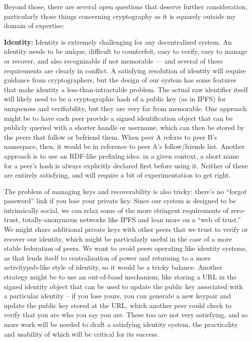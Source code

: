 Beyond those, there are several open questions that deserve further
consideration, particularly those things concerning cryptography as it
is squarely outside my domain of expertise:

\textbf{Identity:} Identity is extremely challenging for any
decentralized system. An identity needs to be unique, difficult to
counterfeit, easy to verify, easy to manage or recover, and also
recognizable if not memorable --- and several of these requirements are
clearly in conflict. A satisfying resolution of identity will require
guidance from cryptographers, but the design of our system has some
features that make identity a less-than-intractable problem. The actual
raw identifier itself will likely need to be a cryptographic hash of a
public key (as in IPFS) for uniqueness and verifiability, but they are
very far from memorable. One approach might be to have each peer provide
a signed identification object that can be publicly queried with a
shorter handle or username, which can then be stored by the peers that
follow or befriend them. When peer A referrs to peer B's namespace,
then, it would be in reference to peer A's follow/friends list. Another
approach is to use an RDF-like prefixing idea: in a given context, a
short name for a peer's hash is always explicitly declared first before
using it. Neither of these are entirely satisfying, and will require a
bit of experimentation to get right.

The problem of managing keys and recoverability is also tricky: there's
no ``forgot password'' link if you lose your private key. Since our
system is designed to be intrinsically social, we can relax some of the
more stringent requirements of zero-trust, totally-anonymous networks
like IPFS and lean more on a ``web of trust.'' We might share additional
private keys with other peers that we trust to verify or recover our
identity, which might be particularly useful in the case of a more
stable federation of peers. We want to avoid peers operating like
identity systems, as that lends itself to centralization of power and
returning to a more activitypub-like style of identity, so it would be a
tricky balance. Another strategy might be to use an out-of-band
mechanism, like storing a URL in the signed identity object that can be
used to update the public key associated with a particular identity --
if you lose yours, you can generate a new keypair and update the public
key stored at the URL, which another peer could check to verify that you
are who you say you are. These too are not very satisfying, and so more
work will be needed to draft a satisfying identity system, the
practicality and usability of which will be critical for its success.

